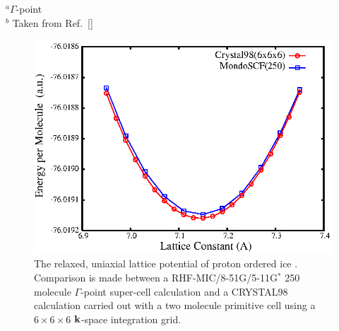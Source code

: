 \documentclass[prb,aps,nobibnotes,twocolumn,doublespace,twocolumngrid,superbib,showpacs]{revtex4}
\begin{document}
\begin{table}[h]
\caption{Lattice constants in \AA for diamond computed using different system sizes, 
theory levels, and basis sets at a {\tt LOOSE} accuracy. For comparison, 
the experimental value for diamond, extrapolated to $T = 0 K$, is 
${\rm a}_0 = 3.567$\AA, while ${\rm a}_0 = 3.583$\AA~is obtained 
with both the RPBE/6-31G* GGA and the RTPSS/6-31G* meta-GGA level of theory \cite{JTao03}.}
\label{DiamondLC}
\raggedright{
{\hskip 0.33in}$^a \Gamma$-point\\
{\hskip 0.33in}$^b$ Taken from Ref.~[]\\}
\end{table}


\begin{figure}
\caption{The relaxed, uniaxial lattice potential of proton ordered ice \cite{SCasassa97}.
Comparison is made between a RHF-MIC/8-51G/5-11G$^*$ 250 molecule $\Gamma$-point super-cell 
calculation and a {\sc CRYSTAL98} calculation carried out with a two molecule primitive
cell using a~$6\times6\times6$ ${\bf k}$-space integration grid.}
\label{IceEnergyVsLattice}
{\center \includegraphics{pIce_En_vs_a.ps}\par}
\end{figure}
\end{document}
